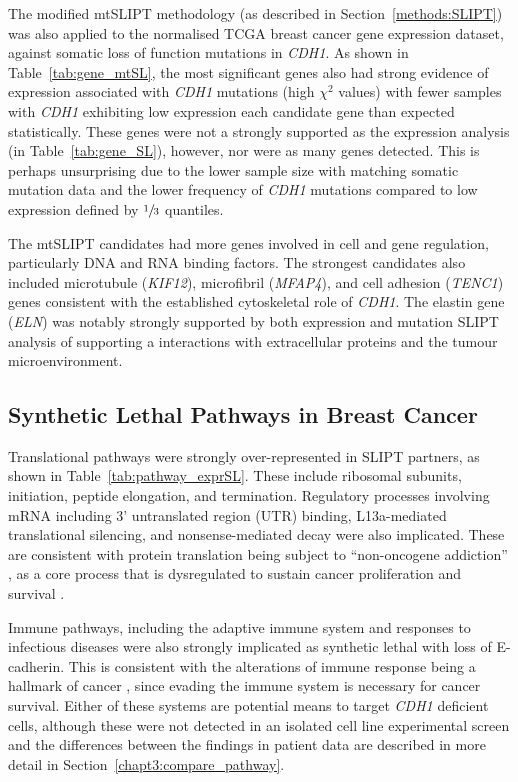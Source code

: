 The modified mtSLIPT methodology (as described in Section~\ref{methods:SLIPT}) was also applied to the normalised TCGA breast cancer gene expression dataset, against somatic loss of function mutations in \textit{CDH1}. As shown in Table~\ref{tab:gene_mtSL}, the most significant genes also had strong evidence of expression associated with \textit{CDH1} mutations (high $\chi^2$ values) with fewer samples with \textit{CDH1} exhibiting low expression each candidate gene than expected statistically. These genes were not a strongly supported as the expression analysis (in Table~\ref{tab:gene_SL}), however, nor were as many genes detected. This is perhaps unsurprising due to the lower sample size with matching somatic mutation data and the lower frequency of \textit{CDH1} mutations compared to low expression defined by $\sfrac{1}{3}$ quantiles.

The mtSLIPT candidates had more genes involved in cell and gene regulation, particularly DNA and RNA binding factors. The strongest candidates also included microtubule (\textit{KIF12}), microfibril (\textit{MFAP4}), and cell adhesion (\textit{TENC1}) genes consistent with the established cytoskeletal role of \textit{CDH1}. The elastin gene (\textit{ELN}) was notably strongly supported by both expression and mutation SLIPT analysis of  supporting a interactions with extracellular proteins and the tumour microenvironment.


\subsection{Synthetic Lethal Pathways in Breast Cancer} \label{chapt3:exprSL_pathways}

Translational pathways were strongly over-represented in \gls{SLIPT} partners, as shown in Table~\ref{tab:pathway_exprSL}. These include ribosomal subunits, initiation, peptide elongation, and termination. Regulatory processes involving mRNA including 3' untranslated region (UTR) binding, L13a-mediated translational silencing, and nonsense-mediated decay were also implicated. These are consistent with protein translation being subject to ``non-oncogene addiction'' \citep{Luo2009}, as a core process that is dysregulated to sustain cancer proliferation and survival \citep{Gao2015}.

Immune pathways, including the adaptive immune system and responses to infectious diseases were also strongly implicated as synthetic lethal with loss of E-cadherin. This is consistent with the alterations of immune response being a hallmark of cancer \cite{Hanahan2000}, since evading the immune system is necessary for cancer survival. Either of these systems are potential means to target \textit{CDH1} deficient cells, although these were not detected in an isolated cell line experimental screen \citep{Telford2015} and the differences between the findings in patient data are described in more detail in Section~\ref{chapt3:compare_pathway}.

